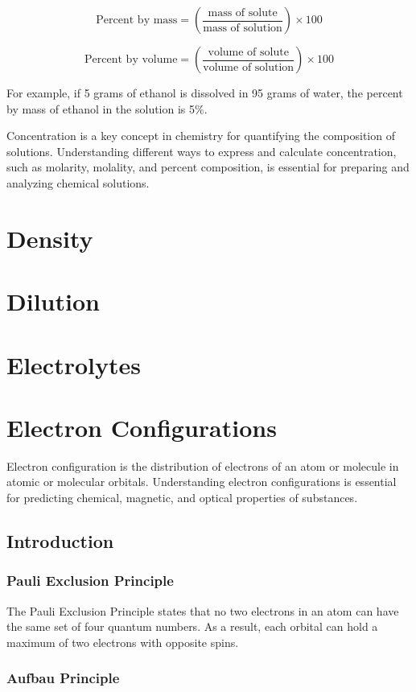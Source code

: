 \documentclass[10pt, roman]{article}
\begin{document}
\[
\text{Percent by mass} = \left( \frac{\text{mass of solute}}{\text{mass of solution}} \right) \times 100
\]

\[
\text{Percent by volume} = \left( \frac{\text{volume of solute}}{\text{volume of solution}} \right) \times 100
\]

For example, if 5 grams of ethanol is dissolved in 95 grams of water, the percent by mass of ethanol in the solution is 5\%.

Concentration is a key concept in chemistry for quantifying the composition of solutions. Understanding different ways to express and calculate concentration, such as molarity, molality, and percent composition, is essential for preparing and analyzing chemical solutions.

\section{Density}
\section{Dilution}
\section{Electrolytes}
\section{Electron Configurations}
Electron configuration is the distribution of electrons of an atom or molecule in atomic or molecular orbitals. Understanding electron configurations is essential for predicting chemical, magnetic, and optical properties of substances.
\subsection{Introduction}
\subsubsection{Pauli Exclusion Principle}

The Pauli Exclusion Principle states that no two electrons in an atom can have the same set of four quantum numbers. As a result, each orbital can hold a maximum of two electrons with opposite spins.

\subsubsection{Aufbau Principle}
\end{document}
